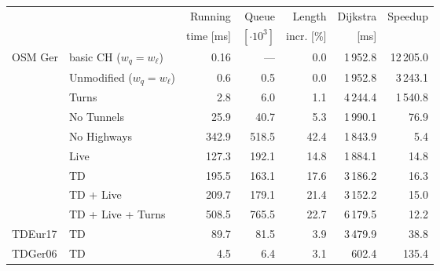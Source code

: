 \begin{tabular}{llrrrrr}
\toprule
 & &   Running &                Queue &     Length & Dijkstra & Speedup \\ & & time [ms] & $[\cdot 10^3]$ & incr. [\%] &     [ms] &         \\
\midrule
\multirow{9}{*}{OSM Ger} & basic CH ($w_q=w_\ell$) &              0.16 &              --- &       0.0 &                    1\,952.8 &   12\,205.0 \\
 & Unmodified ($w_q=w_\ell$) &              0.6 &              0.5 &       0.0 &                    1\,952.8 &   3\,243.1 \\
        & Turns &              2.8 &              6.0 &       1.1 &                    4\,244.4 &   1\,540.8 \\
        & No Tunnels &             25.9 &             40.7 &       5.3 &                    1\,990.1 &     76.9 \\
        & No Highways &            342.9 &            518.5 &      42.4 &                    1\,843.9 &      5.4 \\
        & Live &            127.3 &            192.1 &      14.8 &                    1\,884.1 &     14.8 \\
        & TD &            195.5 &            163.1 &      17.6 &                    3\,186.2 &     16.3 \\
        & TD + Live &            209.7 &            179.1 &      21.4 &                    3\,152.2 &     15.0 \\
        & TD + Live + Turns &            508.5 &            765.5 &      22.7 &                    6\,179.5 &     12.2 \\
\addlinespace
TDEur17 & TD &             89.7 &             81.5 &       3.9 &                    3\,479.9 &     38.8 \\
TDGer06 & TD &              4.5 &              6.4 &       3.1 &                     602.4 &    135.4 \\
\bottomrule
\end{tabular}

